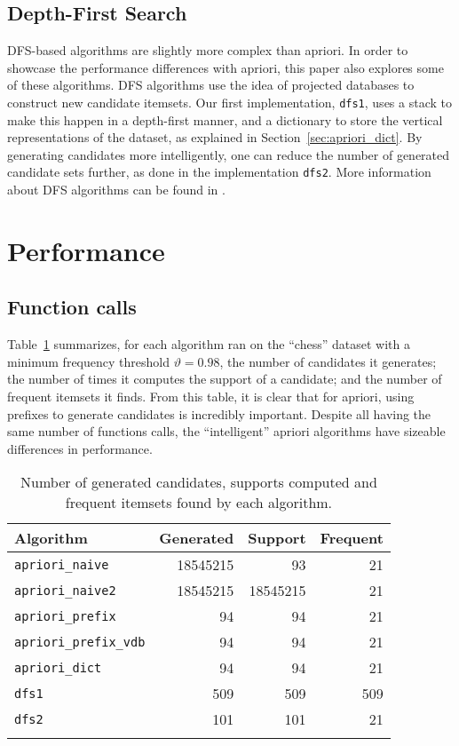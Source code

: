 \documentclass[journal, 9pt]{IEEEtran}
\theoremstyle{definition}
\newcommand{\py}[1]{\texttt{#1}}
\renewcommand{\theta}{\vartheta}
\begin{document}
\subsection{Depth-First Search}
DFS-based algorithms are slightly more complex than apriori.
In order to showcase the performance differences with apriori, this paper also explores some of these algorithms.
DFS algorithms use the idea of projected databases to construct new candidate itemsets.
Our first implementation, \py{dfs1}, uses a stack to make this happen in a depth-first manner, and a dictionary to store the vertical representations of the dataset, as explained in Section~\ref{sec:apriori_dict}.
By generating candidates more intelligently, one can reduce the number of generated candidate sets further, as done in the implementation \py{dfs2}.
More information about DFS algorithms can be found in \cite{eclat}.

\section{Performance}
\label{sec:perf}
\subsection{Function calls}
Table~\ref{tab:fcalls} summarizes, for each algorithm ran on the ``chess'' dataset with a minimum frequency threshold \(\theta = 0.98\), the number of candidates it generates; the number of times it computes the support of a candidate; and the number of frequent itemsets it finds.
From this table, it is clear that for apriori, using prefixes to generate candidates is incredibly important.
Despite all having the same number of functions calls, the ``intelligent'' apriori algorithms have sizeable differences in performance.
\begin{table}[!hbtp]
	\label{tab:fcalls}
	\centering
	\begin{tabular}{lrrr}
		\toprule
		Algorithm & Generated & Support & Frequent \\
		 \midrule
		\py{apriori_naive} & 18545215 & 93 & 21 \\
		\py{apriori_naive2} & 18545215 & 18545215 & 21  \\
		\py{apriori_prefix} & 94 & 94 & 21 \\
		\py{apriori_prefix_vdb} & 94 & 94 & 21 \\
		\py{apriori_dict} & 94 & 94 & 21 \\
		\py{dfs1} & 509 & 509 & 509 \\
		\py{dfs2} & 101 & 101 & 21 \\
		\bottomrule\\
	\end{tabular}
	\caption{Number of generated candidates, supports computed and frequent itemsets found by each algorithm.}
\end{table}
\end{document}
